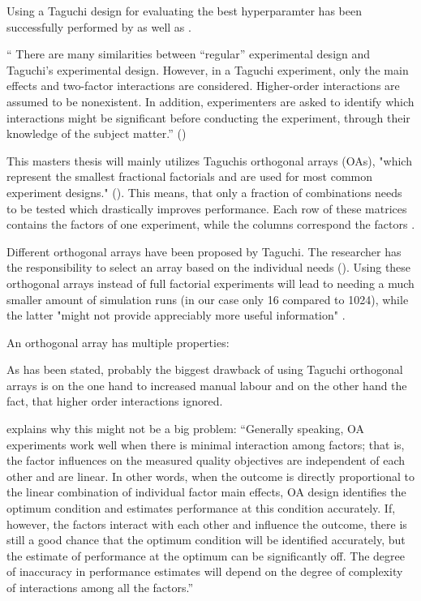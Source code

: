 Using a Taguchi design for evaluating the best hyperparamter has been successfully performed by \cite{dao_maximising_2016} as well as \cite{assistant_professor_amity_university_jaipur_rajasthan_india_parameter_2019}. 

\enquote{ There are many similarities between “regular” experimental design and Taguchi's experimental design. However, in a Taguchi experiment, only the main effects and two-factor interactions are considered. Higher-order interactions are assumed to be nonexistent. In addition, experimenters are asked to identify which interactions might be significant before conducting the experiment, through their knowledge of the subject matter.} (\cite{yang_design_2009})

This masters thesis will mainly utilizes Taguchis orthogonal arrays (OAs), "which represent the smallest fractional factorials and are used for most common experiment designs." (\cite{roy_primer_1990}). This means, that only a fraction of combinations needs to be tested which drastically improves performance. Each row of these matrices contains the factors of one experiment, while the columns correspond the factors \cite{li_taguchi_2021}. 

Different orthogonal arrays have been proposed by Taguchi. The researcher has the responsibility to select an array based on the individual needs (\cite{li_taguchi_2021}).
Using these orthogonal arrays instead of full factorial experiments will lead to needing a much smaller amount of simulation runs (in our case only 16 compared to 1024), while the latter "might not provide appreciably more useful information" \cite{roy_primer_1990}.


An orthogonal array has multiple properties:



As has been stated, probably the biggest drawback of using Taguchi orthogonal arrays is on the one hand to increased manual labour and on the other hand the fact, that higher order interactions ignored.

\cite{roy_primer_1990} explains why this might not be a big problem:
\enquote{Generally speaking, OA experiments work well when there is minimal interaction among factors; that is, the factor influences on the measured quality objectives are independent of each other and are linear. In other words, when the outcome is directly proportional to the linear combination of individual factor main effects, OA design identifies the optimum condition and estimates performance at this condition accurately. If, however, the factors interact with each other and influence the outcome, there is still a good chance that the optimum condition will be identified accurately, but the estimate of performance at the optimum can be significantly off. The degree of inaccuracy in performance estimates will depend on the degree of complexity of interactions among all the factors.}

